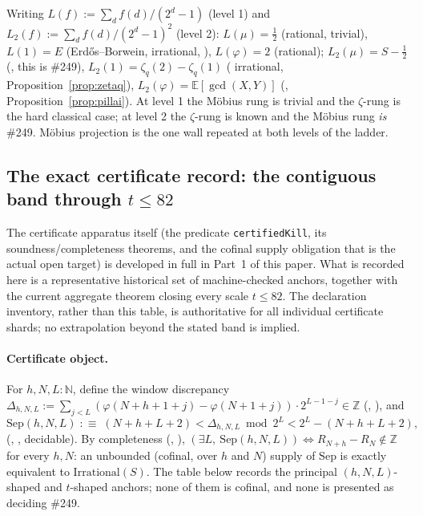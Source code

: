 \begin{rem}
Writing $L(f):=\sum_d f(d)/(2^d-1)$ (level 1) and $L_2(f):=\sum_d f(d)/(2^d-1)^2$
(level 2): $L(\mu)=\tfrac12$ (rational, trivial), $L(1)=E$ (Erd\H{o}s--Borwein,
irrational, ), $L(\varphi)=2$ (rational); $L_2(\mu)=S-\tfrac12$
(, this is \#249), $L_2(1)=\zeta_q(2)-\zeta_q(1)$ (
irrational, Proposition~\ref{prop:zetaq}), $L_2(\varphi)=\mathbb{E}[\gcd(X,Y)]$
(, Proposition~\ref{prop:pillai}). At level 1 the M\"obius rung is
trivial and the $\zeta$-rung is the hard classical case; at level 2 the
$\zeta$-rung is known and the M\"obius rung \emph{is} \#249. M\"obius
projection is the one wall repeated at both levels of the ladder.
\end{rem}

\subsection{The exact certificate record: the contiguous band through $t\le82$}
\label{ssec:certtable}

The certificate apparatus itself (the predicate \texttt{certifiedKill}, its
soundness/completeness theorems, and the cofinal supply obligation that is the
actual open target) is developed in full in Part~1 of this paper. What is
recorded here is a representative historical set of machine-checked anchors,
together with the current aggregate theorem closing every scale $t\le82$.
The declaration inventory, rather than this table, is authoritative for all
individual certificate shards; no extrapolation beyond the stated band is
implied.

\paragraph{Certificate object.} For $h,N,L : \mathbb{N}$, define the window
discrepancy $\Delta_{h,N,L} := \sum_{j<L} (\varphi(N+h+1+j)-\varphi(N+1+j))\cdot 2^{L-1-j} \in \mathbb{Z}$
(, ), and
\[
\mathrm{Sep}(h,N,L) \;:\equiv\; (N+h+L+2) < \Delta_{h,N,L} \bmod 2^{L} < 2^{L}-(N+h+L+2),
\]
(, , decidable). By
completeness (,
), $(\exists L,\ \mathrm{Sep}(h,N,L)) \iff R_{N+h}-R_N \notin \mathbb{Z}$
for every $h,N$: an unbounded (cofinal, over $h$ and $N$) supply of
$\mathrm{Sep}$ is exactly equivalent to $\mathrm{Irrational}(S)$. The table
below records the principal $(h,N,L)$-shaped and $t$-shaped anchors; none of
them is cofinal, and none is presented as deciding \#249.

